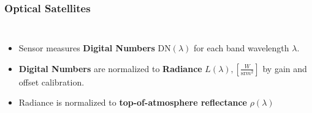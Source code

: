 \documentclass[%
  aspectratio=169,
  9pt,
  USenglish,
  titlegraphic, %
  affiliationintitlepagehead,
  affiliation,
]{beamer}
\begin{document}
%
\begin{frame}
\frametitle{Optical Satellites}
\begin{columns}
	
	
	\begin{itemize}[itemsep=.5em]
		\item<1-> Sensor measures \textbf{Digital Numbers} $\text{DN}(\lambda)$ for each band wavelength $\lambda$. 
		\item<2-> \textbf{Digital Numbers} are normalized to \textbf{Radiance} 
		$L(\lambda), \left[\frac{W}{\text{sr}m^2}\right]$ by gain and offset calibration.
		\item<3-> Radiance is normalized to \textbf{top-of-atmosphere reflectance} $\rho(\lambda)$
	\end{itemize}
	
	
	
	
	
\end{columns}
\end{frame}
\end{document}
